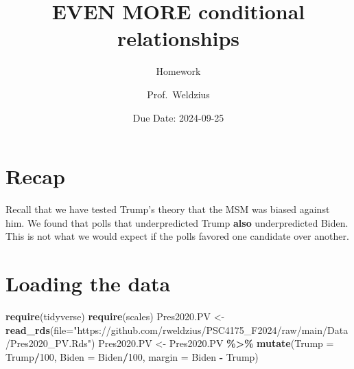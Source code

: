 \documentclass[
]{article}
\title{EVEN MORE conditional relationships}
\subtitle{Homework}
\author{Prof.~Weldzius}
\date{Due Date: 2024-09-25}
\newenvironment{Shaded}{\begin{snugshade}}{\end{snugshade}}
\newcommand{\AttributeTok}[1]{\textcolor[rgb]{0.13,0.29,0.53}{#1}}
\newcommand{\DecValTok}[1]{\textcolor[rgb]{0.00,0.00,0.81}{#1}}
\newcommand{\FunctionTok}[1]{\textcolor[rgb]{0.13,0.29,0.53}{\textbf{#1}}}
\newcommand{\NormalTok}[1]{#1}
\newcommand{\OtherTok}[1]{\textcolor[rgb]{0.56,0.35,0.01}{#1}}
\newcommand{\SpecialCharTok}[1]{\textcolor[rgb]{0.81,0.36,0.00}{\textbf{#1}}}
\newcommand{\StringTok}[1]{\textcolor[rgb]{0.31,0.60,0.02}{#1}}
\begin{document}
\maketitle

\section{Recap}\label{recap}

Recall that we have tested Trump's theory that the MSM was biased
against him. We found that polls that underpredicted Trump \textbf{also}
underpredicted Biden. This is not what we would expect if the polls
favored one candidate over another.

\section{Loading the data}\label{loading-the-data}

\begin{Shaded}
\begin{Highlighting}[]
\FunctionTok{require}\NormalTok{(tidyverse)}
\FunctionTok{require}\NormalTok{(scales)}
\NormalTok{Pres2020.PV }\OtherTok{\textless{}{-}} \FunctionTok{read\_rds}\NormalTok{(}\AttributeTok{file=}\StringTok{"https://github.com/rweldzius/PSC4175\_F2024/raw/main/Data/Pres2020\_PV.Rds"}\NormalTok{)}
\NormalTok{Pres2020.PV }\OtherTok{\textless{}{-}}\NormalTok{ Pres2020.PV }\SpecialCharTok{\%\textgreater{}\%}
                \FunctionTok{mutate}\NormalTok{(}\AttributeTok{Trump =}\NormalTok{ Trump}\SpecialCharTok{/}\DecValTok{100}\NormalTok{,}
                      \AttributeTok{Biden =}\NormalTok{ Biden}\SpecialCharTok{/}\DecValTok{100}\NormalTok{,}
                      \AttributeTok{margin =}\NormalTok{ Biden }\SpecialCharTok{{-}}\NormalTok{ Trump)}
\end{Highlighting}
\end{Shaded}
\end{document}
